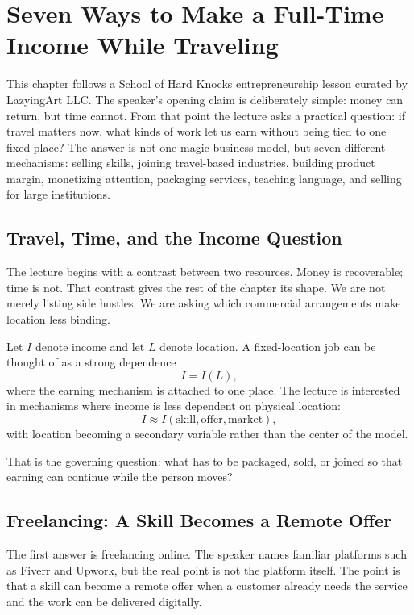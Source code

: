 \chapter{Seven Ways to Make a Full-Time Income While Traveling}

This chapter follows a School of Hard Knocks entrepreneurship lesson curated by LazyingArt LLC. The speaker's opening claim is deliberately simple: money can return, but time cannot. From that point the lecture asks a practical question: if travel matters now, what kinds of work let us earn without being tied to one fixed place? The answer is not one magic business model, but seven different mechanisms: selling skills, joining travel-based industries, building product margin, monetizing attention, packaging services, teaching language, and selling for large institutions.

\section{Travel, Time, and the Income Question}

The lecture begins with a contrast between two resources. Money is recoverable; time is not. That contrast gives the rest of the chapter its shape. We are not merely listing side hustles. We are asking which commercial arrangements make location less binding.

Let \(I\) denote income and let \(L\) denote location. A fixed-location job can be thought of as a strong dependence
\begin{equation}
I = I(L),
\end{equation}
where the earning mechanism is attached to one place. The lecture is interested in mechanisms where income is less dependent on physical location:
\begin{equation}
I \approx I(\text{skill},\text{offer},\text{market}),
\end{equation}
with location becoming a secondary variable rather than the center of the model.

That is the governing question: what has to be packaged, sold, or joined so that earning can continue while the person moves?

\section{Freelancing: A Skill Becomes a Remote Offer}

The first answer is freelancing online. The speaker names familiar platforms such as Fiverr and Upwork, but the real point is not the platform itself. The point is that a skill can become a remote offer when a customer already needs the service and the work can be delivered digitally.

